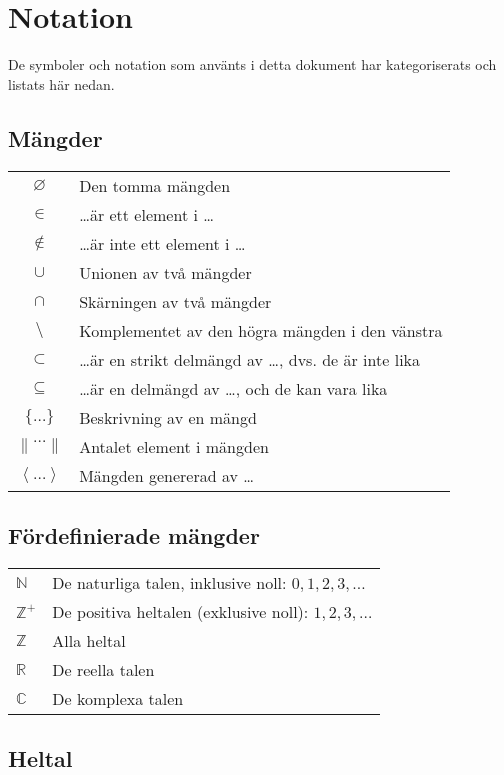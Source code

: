 \chapter{Notation}

De symboler och notation som använts i detta dokument har kategoriserats och listats här nedan.

\section{Mängder}

\begin{tabular}{cp{10.5cm}}
$\varnothing$	& Den tomma mängden \\ 
$\in$	& \ldots är ett element i \ldots \\ 
$\notin$	&  \ldots är inte ett element i \ldots \\ 
$\cup$	& Unionen av två mängder \\ 
$\cap$	&  Skärningen av två mängder \\ 
$\setminus$	&  Komplementet av den högra mängden i den vänstra \\ 
$\subset$	& \ldots är en strikt delmängd av \ldots, dvs. de är inte lika \\ 
$\subseteq$	& \ldots är en delmängd av \ldots, och de kan vara lika \\ 
$\{ \ldots \}$	& Beskrivning av en mängd \\ 
$\left\|  \ldots \right\|$	& Antalet element i mängden \\ 
$\left\langle \ldots \right\rangle $	& Mängden genererad av \ldots \\ 
\end{tabular} 

\section{Fördefinierade mängder}

\begin{tabular}{lp{10.5cm}}
$\mathbb{N}$ & De naturliga talen, inklusive noll: $0, 1, 2, 3, \ldots$ \\
$\mathbb{Z^+}$ & De positiva heltalen (exklusive noll): $1, 2, 3, \ldots$ \\
$\mathbb{Z}$ & Alla heltal \\
$\mathbb{R}$ & De reella talen \\
$\mathbb{C}$ & De komplexa talen
\end{tabular}

\section{Heltal}


